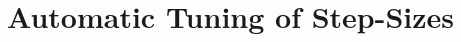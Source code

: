 \section{Automatic Tuning of Step-Sizes}
\begin{comment}
We now argue, in a heuristic manner, as to why constant step-size with PR-averaging might be a principled idea, especially in TD type algorithms. Consider the following LSA with time varying step-sizes $\alpha_t>0$
\begin{align}
\theta_t=\theta_{t-1}+\alpha_t(b_t-A_t\theta_{t-1}).
\end{align}
It is known from asymptotic results by \cite{borkarbook,kushner}\todoch{Check about Kushner} that in order to handle the noise the step-sizes have to be diminishing i.e., $\alpha_t\ra$, unsummable i.e., $\sum_{t \geq 0}\alpha_t=\infty$ and square summable $\sum_{t\geq 0}\alpha_t^2<\infty$. We now look at two specific diminishing step-size sequences, to illustrate the issues that the diminishing step-sizes presents us with. In what follows, we assume that the maximum eigevalue of $\EE{A_t}$ is less that $1$.
\begin{itemize}[leftmargin=*, before = \leavevmode\vspace{-\baselineskip}]
\item \textbf{$\alpha_t=\frac{1}{t}$\footnote{While $\frac{c}{t}$, $c\geq 0$ is more general, it is enough to consider $\frac1t$ by accommodating the multiple $c$ as part of the matrix $A_t$}} is known yield a rate of $\frac{1}{t^{\lambda_{\min}}}$, where $\lambda_{\min}$ is the smallest real part of the eigen values of the matrix $\EE{A_t}$.
\item \textbf{$\alpha_t=\frac{c}{c+t}$} is another example, where the step size decays at a rate $\frac{1}{t/c}$. The rate of decay of error in this case turns out to be $\frac{c^2\sigma_b^2}{t}$, whenever $c>\frac{1}{\lambda_{\min}}$, which can be ensured only when $\lambda_{\min}$ is known.
\end{itemize}
In contrast, in the case of constant step-size with PR-averaging, not knowing the problem instance can result in instability, and when we manage to choose a step-size that results in stable behavior, the rates obtained in \Cref{th:pdrate,cor:as} hold for it. Using this observation, the constant-step size can be set in a more prinicipled manner as showing the pseudocode below.
\end{comment}
